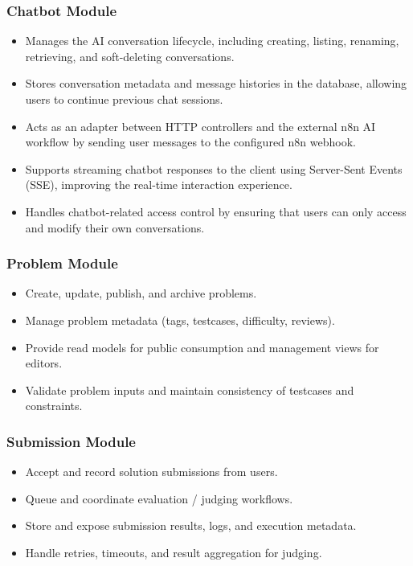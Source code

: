 \subsubsection{Chatbot Module}
\begin{itemize}
    \item Manages the AI conversation lifecycle, including creating, listing, renaming, retrieving, and soft-deleting conversations.
    \item Stores conversation metadata and message histories in the database, allowing users to continue previous chat sessions.
    \item Acts as an adapter between HTTP controllers and the external n8n AI workflow by sending user messages to the configured n8n webhook.
    \item Supports streaming chatbot responses to the client using Server-Sent Events (SSE), improving the real-time interaction experience.
    \item Handles chatbot-related access control by ensuring that users can only access and modify their own conversations.
\end{itemize}

\subsubsection{Problem Module}
\begin{itemize}
    \item Create, update, publish, and archive problems.
    \item Manage problem metadata (tags, testcases, difficulty, reviews).
    \item Provide read models for public consumption and management views for editors.
    \item Validate problem inputs and maintain consistency of testcases and constraints.
\end{itemize}

\subsubsection{Submission Module}
\begin{itemize}
    \item Accept and record solution submissions from users.
    \item Queue and coordinate evaluation / judging workflows.
    \item Store and expose submission results, logs, and execution metadata.
    \item Handle retries, timeouts, and result aggregation for judging.
\end{itemize}

